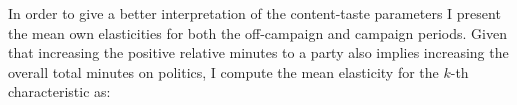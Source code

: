 \documentclass[12pt]{article}
\begin{document}
  In order to give a better interpretation of the content-taste parameters I present the mean own elasticities for both the off-campaign and campaign periods.   Given that increasing the positive relative minutes to a party also implies increasing the overall total minutes on politics, I compute the mean elasticity for the $k$-th characteristic as: 



	
\end{document}
